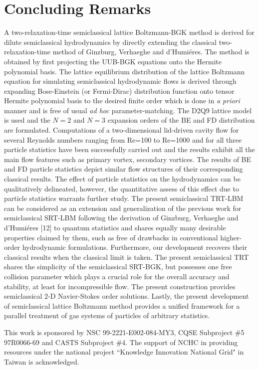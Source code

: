 \documentclass[doublecol]{epl2}
\begin{document}
\section{Concluding Remarks}
A two-relaxation-time semiclassical lattice Boltzmann-BGK method is derived for dilute semiclassical hydrodynamics by directly extending the classical two-relaxation-time method of Ginzburg, Verhaeghe and d'Humi\'{e}res. The method is obtained by first projecting the UUB-BGK equations onto the Hermite polynomial basis.  The lattice equilibrium distribution of the lattice Boltzmann equation for simulating semiclassical hydrodynamic flows is derived through expanding Bose-Einstein (or Fermi-Dirac) distribution function onto tensor Hermite polynomial basis to the desired finite order which is done in {\sl a priori} manner and is free of usual {\sl ad hoc} parameter-matching. The D2Q9 lattice model is used and the $N=2$ and $N=3$ expansion orders of the BE and FD distribution are formulated. Computations of a two-dimensional lid-driven cavity flow for several Reynolds numbers ranging from Re=100 to Re=1000 and for all three particle statistics have been successfully carried out and the results exhibit all the main flow features such as primary vortex, secondary vortices. The results of  BE and FD particle statistics depict similar flow structures of their corresponding classical results. The effect of particle statistics on the hydrodynamics can be qualitatively delineated, however, the quantitative assess of this effect due to particle statistics  warrants further study.
The present semiclassical TRT-LBM can be considered as an extension and generalization of the previous work for semiclassical SRT-LBM following the derivation of Ginzburg, Verhaeghe and d'Humi\'{e}res [12] to quantum statistics and shares equally many desirable properties claimed by them, such as free of drawbacks in conventional higher-order hydrodynamic formulations.  Furthermore, our development recovers their classical results when the classical limit is taken. The present semiclassical TRT shares the simplicity of the semiclassical SRT-BGK, but possesses one free collision parameter which plays a crucial role for the overall accuracy and stability, at least for incompressible flow.  The present
construction provides semiclassical 2-D Navier-Stokes order solutions. Lastly, the present development of semiclassical lattice Boltzmann method provides a unified framework for a parallel treatment of gas systems of particles of arbitrary statistics.

\acknowledgments
This work is sponsored by NSC 99-2221-E002-084-MY3, CQSE Subproject \#5 97R0066-69 and CASTS Subproject \#4.  The support of NCHC in
providing resources under the national project ``Knowledge Innovation National Grid" in Taiwan is acknowledged.
\end{document}
